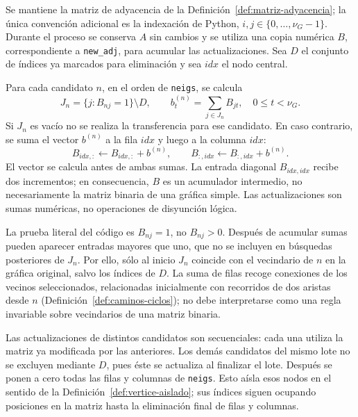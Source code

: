 Se mantiene la matriz de adyacencia de la Definición~\ref{def:matriz-adyacencia}; la única convención adicional es la indexación de Python, $i,j\in\{0,\ldots,\nu_G-1\}$. Durante el proceso se conserva $A$ sin cambios y se utiliza una copia numérica $B$, correspondiente a \texttt{new\_adj}, para acumular las actualizaciones. Sea $D$ el conjunto de índices ya marcados para eliminación y sea $idx$ el nodo central.

Para cada candidato $n$, en el orden de \texttt{neigs}, se calcula
\[
J_n=\{j:B_{nj}=1\}\setminus D,\qquad
b^{(n)}_t=\sum_{j\in J_n}B_{jt},\quad 0\leq t<\nu_G.
\]
Si $J_n$ es vacío no se realiza la transferencia para ese candidato. En caso contrario, se suma el vector $b^{(n)}$ a la fila $idx$ y luego a la columna $idx$:
\[
B_{idx,:}\gets B_{idx,:}+b^{(n)},\qquad
B_{:,idx}\gets B_{:,idx}+b^{(n)}.
\]
El vector se calcula antes de ambas sumas. La entrada diagonal $B_{idx,idx}$ recibe dos incrementos; en consecuencia, $B$ es un acumulador intermedio, no necesariamente la matriz binaria de una gráfica simple. Las actualizaciones son sumas numéricas, no operaciones de disyunción lógica.

La prueba literal del código es $B_{nj}=1$, no $B_{nj}>0$. Después de acumular sumas pueden aparecer entradas mayores que uno, que no se incluyen en búsquedas posteriores de $J_n$. Por ello, sólo al inicio $J_n$ coincide con el vecindario de $n$ en la gráfica original, salvo los índices de $D$. La suma de filas recoge conexiones de los vecinos seleccionados, relacionadas inicialmente con recorridos de dos aristas desde $n$ (Definición~\ref{def:caminos-ciclos}); no debe interpretarse como una regla invariable sobre vecindarios de una matriz binaria.

Las actualizaciones de distintos candidatos son secuenciales: cada una utiliza la matriz ya modificada por las anteriores. Los demás candidatos del mismo lote no se excluyen mediante $D$, pues éste se actualiza al finalizar el lote. Después se ponen a cero todas las filas y columnas de \texttt{neigs}. Esto aísla esos nodos en el sentido de la Definición~\ref{def:vertice-aislado}; sus índices siguen ocupando posiciones en la matriz hasta la eliminación final de filas y columnas.

